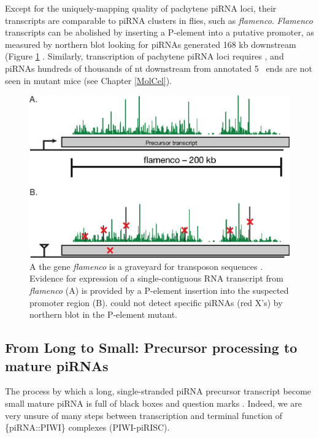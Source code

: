     Except for the uniquely-mapping quality of pachytene piRNA loci, their transcripts are comparable to piRNA clusters in flies, such as \textit{flamenco}. \textit{Flamenco} transcripts can be abolished by inserting a P-element into a putative promoter, as measured by northern blot looking for piRNAs generated 168 kb downstream (Figure \ref{Intro:fig:flamenco} \citep{Brennecke2007,Goriaux2014}. Similarly, transcription of pachytene piRNA loci requires \amyb{}, and piRNAs hundreds of thousands of nt downstream from annotated 5\textprime~ ends are not seen in \amyb{} mutant mice (see Chapter \ref{MolCel}).

    \begin{figure} %
      \centering
      \includegraphics{Figures/Intro/FlamencoLocus.eps}
      \caption[Genetic evidence for long, continuous fly piRNA precursor transcripts]
      {
        A the \flies{} gene \textit{flamenco} is a graveyard for transposon sequences \citep{Pelisson1994}. Evidence for expression of a single-contiguous RNA transcript from \textit{flamenco} (A) is provided by a P-element insertion into the suspected promoter region (B). \citep{Brennecke2007} could not detect specific piRNAs (red X's) by northern blot in the P-element mutant.
        }
      \label{Intro:fig:flamenco}
      \end{figure}

  \subsection{From Long to Small: Precursor processing to mature piRNAs}
    \label{Intro:subsec:Processing of piRNAs in mice}

    The process by which a long, single-stranded piRNA precursor transcript become small mature piRNA is full of black boxes and question marks \citep{Li2013e}. Indeed, we are very unsure of many steps between transcription and terminal function of \{piRNA::PIWI\} complexes (PIWI-piRISC).

